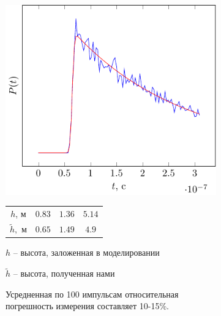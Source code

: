 \documentclass[10pt,pdf,hyperref={unicode}, dvipsnames]{beamer}
\begin{document}
\begin{frame}
\begin{figure}
\begin{subfigure}{0.42\linewidth}
    \end{subfigure}
    \hfill
    \begin{subfigure}{0.42\linewidth}
        \centering
        \includegraphics[width=1\linewidth,page=3]{fig/retracking/model}
    \end{subfigure}
    \hfill
    \begin{subfigure}{0.42\linewidth}
        \begin{tabular}{|c|c|c|c|}
            \hline
            $h$, м      & $0.83$ & $1.36$ & $5.14$\\
            $\tilde h,$ м & $0.65$ & $1.49$ & $4.9$\\
            \hline
        \end{tabular}

        \vspace{\baselineskip}

        $h$ -- высота, заложенная в моделировании

        $\tilde h$ -- высота, полученная нами

        Усредненная по 100 импульсам относительная погрешность измерения
        составляет 10-15\%.
    \end{subfigure}

\end{figure}
\end{frame}
\end{document}

